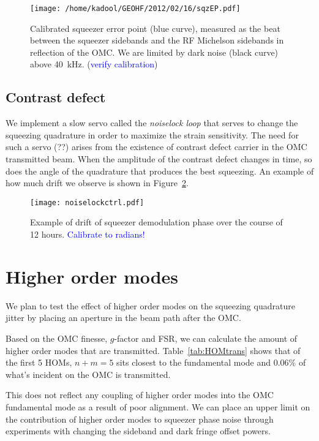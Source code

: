 \documentclass{ligodoc}
\begin{document}
\begin{figure}
\begin{centering}
\texttt{[image: /home/kadool/GEOHF/2012/02/16/sqzEP.pdf]}
\caption{Calibrated squeezer error point (blue curve), measured as the
  beat between the squeezer sidebands and the RF Michelson sidebands
  in reflection of the OMC. We are limited by dark noise (black curve)
  above 40~kHz. (\textcolor{blue}{verify calibration})}
\label{fig:sqzEP}
\end{centering}
\end{figure}



\subsection{Contrast defect}
We implement a slow servo called the \emph{noiselock loop} that serves
to change the squeezing quadrature in order to maximize the strain
sensitivity. The need for such a servo (??) arises from the existence of
contrast defect carrier in the OMC transmitted beam. When the
amplitude of the contrast defect changes in time, so does the angle of
the quadrature that produces the best squeezing. An example of how
much drift we observe is shown in Figure~\ref{fig:noiselock}. 

\begin{figure}
\begin{centering}
\texttt{[image: noiselockctrl.pdf]}
\caption{Example of drift of squeezer demodulation phase over the
  course of 12 hours. \textcolor{blue}{Calibrate to radians!}}
\label{fig:noiselock}
\end{centering}
\end{figure}


\section{Higher order modes}
We plan to test the effect of higher order modes on the squeezing
quadrature jitter by placing an aperture in the beam path after the
OMC.

Based on the OMC finesse, $g$-factor and FSR, we can calculate the
amount of higher order modes that are
transmitted. Table~\ref{tab:HOMtrans} shows that of the first 5 HOMs,
$n+m=5$ sits closest to the fundamental mode and $0.06\%$ of what's
incident on the OMC is transmitted. 

This does not reflect any coupling of higher order modes into the OMC
fundamental mode as a result of poor alignment. We can place an upper
limit on the contribution of higher order modes to squeezer phase
noise through experiments with changing the sideband and dark fringe
offset powers.
\end{document}
